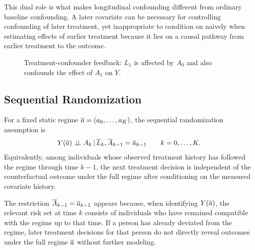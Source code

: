This dual role is what makes longitudinal confounding different from ordinary
baseline confounding. A later covariate can be necessary for controlling
confounding of later treatment, yet inappropriate to condition on naively when
estimating effects of earlier treatment because it lies on a causal pathway from
earlier treatment to the outcome.

\begin{figure}[H]
\centering
{}
\caption{Treatment-confounder feedback: $L_1$ is affected by $A_0$ and also confounds the effect of $A_1$ on $Y$.}
\label{fig:ch8-time-varying-confounding}
\end{figure}

\subsection{Sequential Randomization}

\begin{assumptionbox}
For a fixed static regime $\overline{a}=(a_0,\ldots,a_K)$, the sequential
randomization assumption is
\[
  Y(\overline{a}) \perp\!\!\!\perp A_k \,\vert\, \overline{L}_k,\overline{A}_{k-1}=\overline{a}_{k-1}
  \qquad k=0,\ldots,K.
\]
Equivalently, among individuals whose observed treatment history has followed
the regime through time $k-1$, the next treatment decision is independent of the
counterfactual outcome under the full regime after conditioning on the measured
covariate history.
\end{assumptionbox}

The restriction $\overline{A}_{k-1}=\overline{a}_{k-1}$ appears because, when identifying
$Y(\overline{a})$, the relevant risk set at time $k$ consists of individuals who have
remained compatible with the regime up to that time. If a person has already
deviated from the regime, later treatment decisions for that person do not
directly reveal outcomes under the full regime $\overline{a}$ without further modeling.

